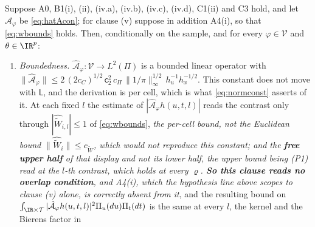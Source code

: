 \begin{proposition}\label{prp:hatAprop}
Suppose A0, B1(i), (ii), (iv.a), (iv.b), (iv.c), (iv.d), C1(ii) and C3 hold, and let
$\hat{\mathcal A}_\varphi$
be \eqref{eq:hatAcon}; for clause (v) suppose in addition A4(i), so that \eqref{eq:wbounds} holds.
Then, conditionally on the sample, and for every $\varphi\in\mathcal V$ and $\theta\in\IR^{p}$:
\begin{enumerate}
\item[(i)] \emph{Boundedness.} $\hat{\mathcal A}_\varphi:\mathcal V\to L^{2}(\Pi)$ is a bounded linear
operator with
$\|\hat{\mathcal A}_\varphi\|\le 2\,(2c_C)^{1/2}\,\mathsf c_2^{2}\,c_\Pi\,\|1/\pi\|_\infty^{1/2}\,h_u^{-1}h_x^{-1/2}$.
This constant does not move with $\mathsf L$, and the derivation is per cell, which is what
\eqref{eq:normconst} asserts of it. At each fixed $l$ the estimate of
$|\hat{\mathcal A}_\varphi h(u,t,l)|$ reads the contrast only through
$|\widehat{\widetilde W}_{i,l}|\le1$ of \eqref{eq:wbounds}, \emph{the per-cell bound, not the
Euclidean bound $\|\widehat{\widetilde W}_i\|\le c_{\widetilde W}$, which would not reproduce
this constant; and the \textbf{free upper half} of that display and not its lower half, the upper bound
being \textup{(P1)} read at the $l$-th contrast, which holds at every $\varrho$. \textbf{So this clause
reads no overlap condition}, and A4(i), which the hypothesis line above scopes to clause \textup{(v)}
alone, is correctly absent from it}, and the resulting bound on $\int_{\IR\times\mathcal T}|\hat{\mathcal A}_\varphi
h(u,t,l)|^{2}\Pi_u(du)\Pi_t(dt)$ is the same at every $l$, the kernel and the Bierens factor in

\end{enumerate}
\end{proposition}
